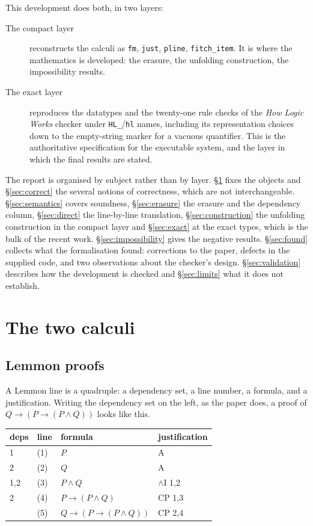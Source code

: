 \documentclass[11pt]{article}
\theoremstyle{plain}
\newcommand{\ubrk}{\_\discretionary{}{}{}}
\newcommand{\isa}[1]{\textup{\texttt{\small #1}}}
\begin{document}
This development does both, in two layers:

\begin{description}
\item[The compact layer] reconstructs the calculi as \isa{fm}, \isa{just},
  \isa{pline}, \isa{fitch\ubrk{}item}. It is where the mathematics is developed:
  the erasure, the unfolding construction, the impossibility results.
\item[The exact layer] reproduces the datatypes and the twenty-one rule checks
  of the \emph{How Logic Works} checker under \isa{HL\ubrk{}}/\isa{hl} names,
  including its representation choices down to the empty-string marker for a
  vacuous quantifier. This is the authoritative specification for the
  executable system, and the layer in which the final results are stated.
\end{description}

\noindent
The report is organised by subject rather than by layer.
\S\ref{sec:calculi} fixes the objects and \S\ref{sec:correct} the several
notions of correctness, which are not interchangeable.
\S\ref{sec:semantics} covers soundness, \S\ref{sec:erasure} the erasure and the
dependency column, \S\ref{sec:direct} the line-by-line translation,
\S\ref{sec:construction} the unfolding construction in the compact layer and
\S\ref{sec:exact} at the exact types, which is the bulk of the recent work.
\S\ref{sec:impossibility} gives the negative results. \S\ref{sec:found} collects
what the formalisation found: corrections to the paper, defects in the
supplied code, and two observations about the checker's design.
\S\ref{sec:validation} describes how the development is checked and
\S\ref{sec:limits} what it does not establish.

\section{The two calculi}\label{sec:calculi}

\subsection{Lemmon proofs}

A Lemmon line is a quadruple: a dependency set, a line number, a formula, and a
justification. Writing the dependency set on the left, as the paper does, a
proof of $Q \to (P \to (P \wedge Q))$ looks like this.

\begin{center}
\begin{tabular}{@{}llll@{}}
\toprule
deps & line & formula & justification \\
\midrule
1    & (1) & $P$                          & A \\
2    & (2) & $Q$                          & A \\
1,2  & (3) & $P \wedge Q$                 & $\wedge$I 1,2 \\
2    & (4) & $P \to (P \wedge Q)$         & CP 1,3 \\
     & (5) & $Q \to (P \to (P \wedge Q))$ & CP 2,4 \\
\bottomrule
\end{tabular}
\end{center}
\end{document}
